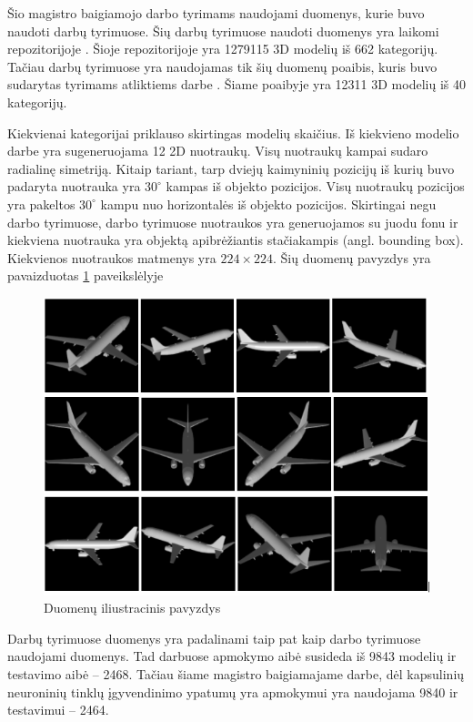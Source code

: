 Šio magistro baigiamojo darbo tyrimams naudojami duomenys, kurie buvo naudoti darbų \cite{cnnExp1, cnnExp2} tyrimuose. Šių darbų tyrimuose naudoti duomenys yra laikomi repozitorijoje \cite{dataRepo}. Šioje repozitorijoje yra 1279115 3D modelių iš 662 kategorijų. Tačiau darbų \cite{cnnExp1, cnnExp2} tyrimuose yra naudojamas tik šių duomenų poaibis, kuris buvo sudarytas tyrimams atliktiems darbe \cite{dbnExp}. Šiame poaibyje yra 12311 3D modelių iš 40 kategorijų.

Kiekvienai kategorijai priklauso skirtingas modelių skaičius. Iš kiekvieno modelio darbe \cite{cnnExp2} yra sugeneruojama 12 2D nuotraukų. Visų nuotraukų kampai sudaro radialinę simetriją. Kitaip tariant, tarp dviejų kaimyninių pozicijų iš kurių buvo padaryta nuotrauka yra $30^{\circ}$ kampas iš objekto pozicijos. Visų nuotraukų pozicijos yra pakeltos $30^{\circ}$ kampu nuo horizontalės iš objekto pozicijos. Skirtingai negu darbo \cite{dbnExp} tyrimuose, darbo \cite{cnnExp2} tyrimuose nuotraukos yra generuojamos su juodu fonu ir kiekviena nuotrauka yra objektą apibrėžiantis stačiakampis (angl. bounding box). Kiekvienos nuotraukos matmenys yra $224\times224$. Šių duomenų pavyzdys yra pavaizduotas \ref{img:data_example} paveikslėlyje


\begin{figure}[H]
	\centering
	\includegraphics[scale=0.5]{img/data_example.png}
	\caption{Duomenų iliustracinis pavyzdys}
	\label{img:data_example}
\end{figure}

Darbų \cite{cnnExp1, cnnExp2} tyrimuose duomenys yra padalinami taip pat kaip darbo \cite{dbnExp} tyrimuose naudojami duomenys. Tad darbuose \cite{cnnExp1, cnnExp2, dbnExp} apmokymo aibė susideda iš 9843 modelių ir testavimo aibė -- 2468. Tačiau šiame magistro baigiamajame darbe, dėl kapsulinių neuroninių tinklų įgyvendinimo ypatumų yra apmokymui yra naudojama 9840 ir testavimui -- 2464.
